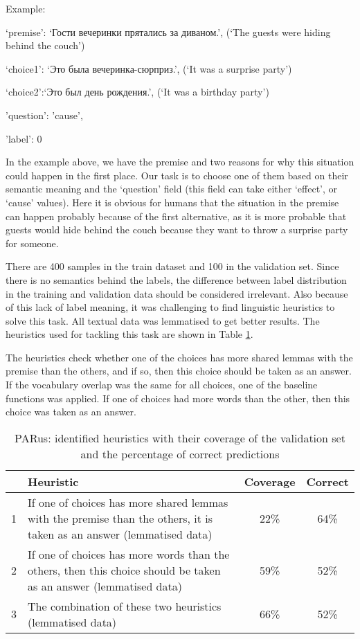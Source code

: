 \documentclass[11pt]{article}
\begin{document}
\begin{flushleft}
Example:
{
`premise': {\foreignlanguage{russian}{`Гости вечеринки прятались за диваном.'}}, 
(`The guests were hiding behind the couch')

`choice1': {\foreignlanguage{russian}{`Это была вечеринка-сюрприз.'}}, (`It was a surprise party')

`choice2':{\foreignlanguage{russian}{`Это был день рождения.'}}, (`It was a birthday party')

'question': 'cause',

'label': 0
}
\end{flushleft}

In the example above, we have the premise and two reasons for why this situation could happen in the first place. Our task is to choose one of them based on their semantic meaning and the `question' field (this field can take either `effect', or `cause' values). Here it is obvious for humans that the situation in the premise can happen probably because of the first alternative, as it is more probable that guests would hide behind the couch because they want to throw a surprise party for someone. 

There are 400 samples in the train dataset and 100 in the validation set. Since there is no semantics behind the labels, the difference between label distribution in the training and validation data should be considered irrelevant. Also because of this lack of label meaning, it was challenging to find linguistic heuristics to solve this task. All textual data was lemmatised to get better results. The heuristics used for tackling this task are shown in Table \ref{table:PARus_heuristics}.

The heuristics check whether one of the choices has more shared lemmas with the premise than the others, and if so, then this choice should be taken as an answer. If the vocabulary overlap was the same for all choices, one of the baseline functions was applied. If one of choices had more words than the other, then this choice was taken as an answer. 

\begin{table}[ht]
\centering
\begin{tabular}{|c|p{}|c|c|}
\hline
&\textbf{Heuristic} & \textbf{Coverage} & \textbf{Correct} \\
\hline
1 & If one of choices has more shared lemmas with the premise than the others, it is taken as an answer (lemmatised data)& 22\% & 64\% \\
\hline
2 & If one of choices has more words than the others, then this choice should be taken as an answer (lemmatised data)& 59\% & 52\% \\
\hline 
3 & The combination of these two heuristics (lemmatised data)& 66\% & 52\% \\
\hline
\end{tabular}
\caption{PARus: identified heuristics with their coverage of the validation set and the percentage of correct predictions}
\label{table:PARus_heuristics}
\end{table}
\end{document}
